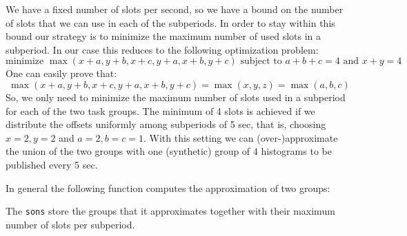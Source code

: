 We have a fixed number of slots per second, so we have a bound on the number of slots that we can use in each of the subperiods. In order to stay within this bound our strategy is to minimize the maximum number of used slots in a subperiod. In our case this reduces to the following optimization problem:
$$ \text{minimize } \max(x+a, y+b, x+c, y+a, x+b, y+c) \text{ subject to } a+b+c=4 \text{ and } x+y = 4 $$
One can easily prove that:
$$ \max(x+a, y+b, x+c, y+a, x+b, y+c) = \max(x, y, z) = \max(a, b, c)$$
So, we only need to minimize the maximum number of slots used in a subperiod for each of the two task groups. The minimum of 4 slots is achieved if we distribute the offsets uniformly among subperiods of 5 sec, that is, choosing $x=2, y=2$ and $a=2, b=c=1$. With this setting we can (over-)approximate the union of the two groups with one (synthetic) group of 4 histograms to be published every 5 sec.

In general the following function computes the approximation of two groups:

The \verb+sons+ store the groups that it approximates together with their maximum number of slots per subperiod.

